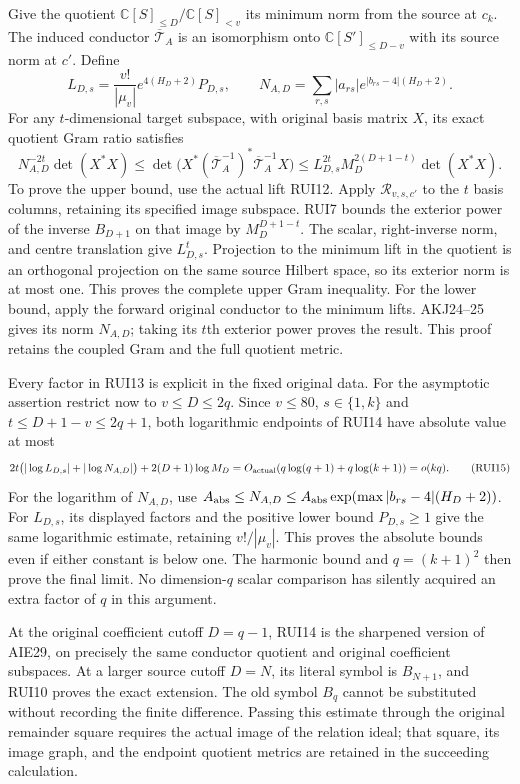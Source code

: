 \documentclass[11pt,a4paper]{article}
\begin{document}
Give the quotient $\mathbb C[S]_{\le D}/\mathbb C[S]_{<v}$ its
minimum norm from the source at $c_k$. The induced conductor
$\overline{\mathcal T}_A$ is an isomorphism onto
$\mathbb C[S']_{\le D-v}$ with its source norm at $c'$. Define
\[
 L_{D,s}=\frac{v!}{|\mu_v|}
          e^{4(H_D+2)}P_{D,s},\qquad
 N_{A,D}=\sum_{r,s}|a_{rs}|
             e^{|b_{rs}-4|(H_D+2)}.
 \tag{RUI13}
\]
For any $t$-dimensional target subspace, with original basis matrix
$X$, its exact quotient Gram ratio satisfies
\[
 N_{A,D}^{-2t}\det(X^*X)
 \le\det\bigl(X^*(\overline{\mathcal T}_A^{-1})^*
                       \overline{\mathcal T}_A^{-1}X\bigr)
 \le L_{D,s}^{2t}M_D^{2(D+1-t)}\det(X^*X).
 \tag{RUI14}
\]
To prove the upper bound, use the actual lift RUI12. Apply
$\mathcal R_{v,s,c'}$ to the $t$ basis columns, retaining its
specified image subspace. RUI7 bounds the exterior power of the
inverse $B_{D+1}$ on that image by $M_D^{D+1-t}$. The scalar,
right-inverse norm, and centre translation give $L_{D,s}^t$.
Projection to the minimum lift in the quotient is an orthogonal
projection on the same source Hilbert space, so its exterior norm
is at most one. This proves the complete upper Gram inequality.
For the lower bound, apply the forward original conductor to the
minimum lifts. AKJ24--25 gives its norm $N_{A,D}$; taking its
$t$th exterior power proves the result. This proof retains the
coupled Gram and the full quotient metric.

Every factor in RUI13 is explicit in the fixed original data.
For the asymptotic assertion restrict now to $v\le D\le2q$.
Since $v\le80$, $s\in\{1,k\}$ and $t\le D+1-v\le2q+1$,
both logarithmic endpoints of RUI14 have absolute value at most
\[
 2t\bigl(|\log L_{D,s}|+|\log N_{A,D}|\bigr)
 +2(D+1)\log M_D
 =O_{\rm actual}(q\log(q+1)+q\log(k+1))=o(kq).
 \tag{RUI15}
\]
For the logarithm of $N_{A,D}$, use
$A_{\rm abs}\le N_{A,D}\le
A_{\rm abs}\exp(\max|b_{rs}-4|(H_D+2))$.
For $L_{D,s}$, its displayed factors and the positive lower bound
$P_{D,s}\ge1$ give the same logarithmic estimate, retaining
$v!/|\mu_v|$. This proves the absolute bounds even if either
constant is below one. The harmonic bound and $q=(k+1)^2$
then prove the final limit. No dimension-$q$ scalar comparison has
silently acquired an extra factor of $q$ in this argument.

At the original coefficient cutoff $D=q-1$, RUI14 is the sharpened
version of AIE29, on precisely the same conductor quotient and
original coefficient subspaces. At a larger source cutoff $D=N$,
its literal symbol is $B_{N+1}$, and RUI10 proves the exact extension.
The old symbol $B_q$ cannot be substituted without recording the
finite difference. Passing this estimate through the original
remainder square requires the actual image of the relation ideal;
that square, its image graph, and the endpoint quotient metrics
are retained in the succeeding calculation.
\end{document}
